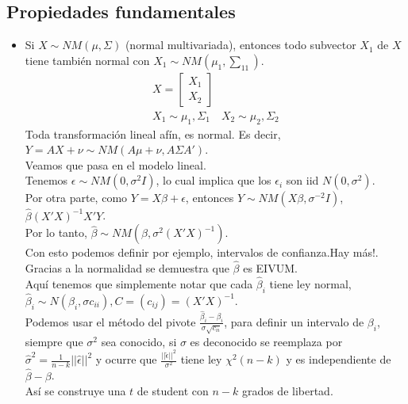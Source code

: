 \documentclass[10pt]{article}
\theoremstyle{plain}
\theoremstyle{definition}
\begin{document}
\subsection{Propiedades fundamentales}
\begin{itemize}
\item Si $X \sim NM(\mu, \Sigma)$ (normal multivariada), entonces todo subvector $X_{1}$ de $X$ tiene también normal con $X_{1} \sim NM(\mu_{1},\sum_{11})$.\\
\begin{align*}
X= \begin{bmatrix}
X_{1}\\ X_{2}
\end{bmatrix}\\
X_{1}\sim \mu_{1},\Sigma_{1}\quad X_{2}\sim \mu_{2},\Sigma_{2}
\end{align*}
Toda transformación lineal afín, es normal. Es decir, $Y=AX+\nu \sim NM(A\mu + \nu, A\Sigma A')$.\\

Veamos que pasa en el modelo lineal.\\
Tenemos $\epsilon \sim NM(0, \sigma^2I)$, lo cual implica que los $\epsilon_{i}$ son iid $N(0,\sigma^2)$.\\
Por otra parte, como $Y = X\beta + \epsilon$, entonces $Y \sim NM(X\beta, \sigma^{-2}I)$, $\hat{\beta} (X'X)^{-1}X'Y$.\\

Por lo tanto, $\hat{\beta} \sim NM(\beta, \sigma^2(X'X)^{-1})$.\\

Con esto podemos definir por ejemplo, intervalos de confianza.Hay más!.\\
Gracias a la normalidad se demuestra que $\hat{\beta}$ es EIVUM.\\

Aquí tenemos que simplemente notar que cada $\hat{\beta}_{i}$ tiene ley normal, $\hat{\beta}_{i} \sim N(\beta_{i}, \sigma c_{ii}), C = (c_{ij}) = (X'X)^{-1}$.\\

Podemos usar el método del pivote $\frac{\hat{\beta}_{i} - \beta_{i}}{\sigma\sqrt{c_{ii}}}$, para definir un intervalo de $\beta_{i}$, siempre que $\sigma^2$ sea conocido, si $\sigma$ es deconocido se reemplaza por $\hat{\sigma}^2 = \frac{1}{n-k} ||\hat{\epsilon}||^2$ y ocurre que $\frac{||\hat{\epsilon}||^2}{\sigma^2}$ tiene ley $\chi^2 (n-k)$ y es independiente de $\hat{\beta} - \beta$.\\

Así se construye una $t$ de student con $n-k$ grados de libertad.
\end{itemize}
\end{document}
